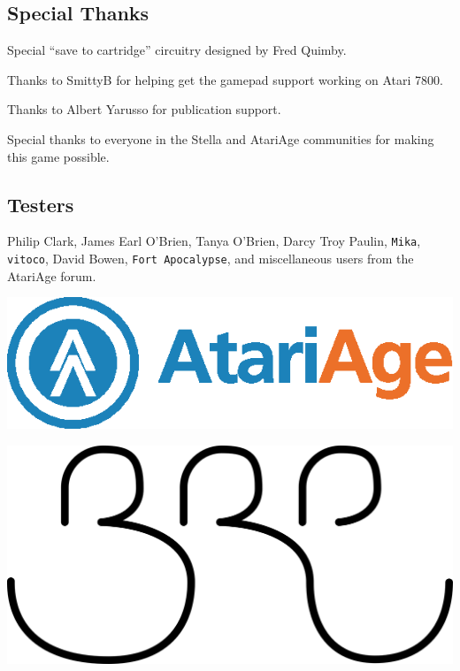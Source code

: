 \documentclass[10pt,twocolumn,openany,article]{memoir}
\begin{document}
\subsection{Special Thanks}

Special ``save to cartridge'' circuitry designed by Fred Quimby.

Thanks  to  SmittyB for  helping  get  the  gamepad support  working  on
Atari 7800.

Thanks to Albert Yarusso for publication support.

Special thanks  to everyone in  the Stella and AtariAge  communities for
making this game possible.

\vspace{30pt}

\subsection{Testers}

Philip Clark,
James Earl O'Brien,
Tanya O'Brien,
Darcy Troy Paulin,
\texttt{Mika},
\texttt{vitoco},
David Bowen,
\texttt{Fort Apocalypse},
and miscellaneous users from the AtariAge forum.

\vfill

\begin{center}
  \ifdefined\ATARIAGESAVE
  \includegraphics[width=.6667\columnwidth]{../Manual/AtariAgeHorizontalColor.eps}
  \vspace{14pt}
  \fi

  \includegraphics[width=.333\columnwidth]{../Manual/BRP.png}
\end{center}

\clearpage
{}
\thispagestyle{empty}

\ifdefined\ATARIAGESAVE
{}
\else
{}
\fi
\end{document}
